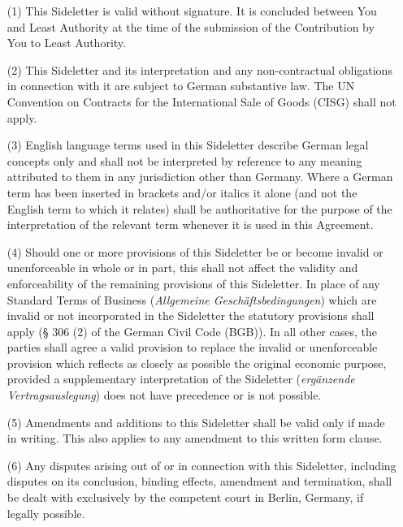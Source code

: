 \begin{itemize}
\item[(1)] This Sideletter is valid without signature. It is concluded between You and Least Authority at the time of the submission of the Contribution by You to Least Authority. 
\item[(2)] This Sideletter and its interpretation and any non-contractual obligations in connection with it are subject to German substantive law. The UN Convention on Contracts for the International Sale of Goods (CISG) shall not apply.
\item[(3)] English language terms used in this Sideletter describe German legal concepts only and shall not be interpreted by reference to any meaning attributed to them in any jurisdiction other than Germany. Where a German term has been inserted in brackets and/or italics it alone (and not the English term to which it relates) shall be authoritative for the purpose of the interpretation of the relevant term whenever it is used in this Agreement.
\item[(4)] Should one or more provisions of this Sideletter be or become invalid or unenforceable in whole or in part, this shall not affect the validity and enforceability of the remaining provisions of this Sideletter. In place of any Standard Terms of Business (\textsl{Allgemeine Geschäftsbedingungen}) which are invalid or not incorporated in the Sideletter the statutory provisions shall apply (§ 306 (2) of the German Civil Code (BGB)). In all other cases, the parties shall agree a valid provision to replace the invalid or unenforceable provision which reflects as closely as possible the original economic purpose, provided a supplementary interpretation of the Sideletter (\textsl{ergänzende Vertragsauslegung}) does not have precedence or is not possible.
\item[(5)] Amendments and additions to this Sideletter shall be valid only if made in writing. This also applies to any amendment to this written form clause. 
\item[(6)] Any disputes arising out of or in connection with this Sideletter, including disputes on its conclusion, binding effects, amendment and termination, shall be dealt with exclusively by the competent court in Berlin, Germany, if legally possible.
\end{itemize}

